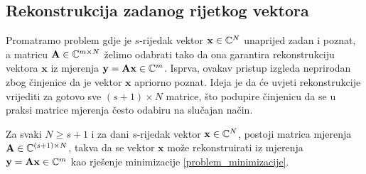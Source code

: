 \documentclass[a4paper,twoside,12pt]{memoir} %
\newcommand{\vect}[1]{\mathbf{#1}}
\renewcommand{\vec}{\vect}
\begin{document}
\subsection[Rekonstrukcija zadanog rijetkog vektora][Rekonstrukcija zadanog rijetkog vektora]{Rekonstrukcija zadanog rijetkog vektora}
Promatramo problem gdje je $s$-rijedak vektor $\vec x \in \C^N$ unaprijed zadan i poznat, a matricu $\vec A \in \C^{m \times N}$ \v{z}elimo odabrati tako da ona garantira rekonstrukciju vektora $\vec x$ iz mjerenja $\vec y = \vec{Ax} \in \C^m$. Isprva, ovakav pristup izgleda neprirodan zbog \v{c}injenice da je vektor $\vec x$ apriorno poznat. Ideja je da \'ce uvjeti rekonstrukcije vrijediti za gotovo sve $(s+1) \times N$ matrice, \v{s}to podupire \v{c}injenicu da se u praksi matrice mjerenja \v{c}esto odabiru na slu\v{c}ajan na\v{c}in.
\begin{thm}
Za svaki $N \geq s + 1$ i za dani $s$-rijedak vektor $\vec x \in \C^N$, postoji matrica mjerenja $\vec A \in \C^{(s+1) \times N}$, takva da se vektor $\vec x$ mo\v{z}e rekonstruirati iz mjerenja $\vec y = \vec{Ax} \in \C^m$ kao rje\v{s}enje minimizacije \eqref{problem_minimizacije}.
\end{thm}
\end{document}
